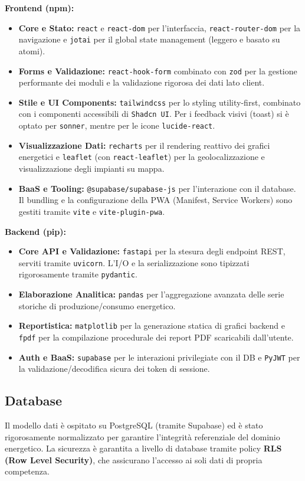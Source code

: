 \textbf{Frontend (npm):}
\begin{itemize}
    \item \textbf{Core e Stato:} \texttt{react} e \texttt{react-dom} per l'interfaccia, \texttt{react-router-dom} per la navigazione e \texttt{jotai} per il global state management (leggero e basato su atomi).
    \item \textbf{Forms e Validazione:} \texttt{react-hook-form} combinato con \texttt{zod} per la gestione performante dei moduli e la validazione rigorosa dei dati lato client.
    \item \textbf{Stile e UI Components:} \texttt{tailwindcss} per lo styling utility-first, combinato con i componenti accessibili di \texttt{Shadcn UI}. Per i feedback visivi (toast) si è optato per \texttt{sonner}, mentre per le icone \texttt{lucide-react}.
    \item \textbf{Visualizzazione Dati:} \texttt{recharts} per il rendering reattivo dei grafici energetici e \texttt{leaflet} (con \texttt{react-leaflet}) per la geolocalizzazione e visualizzazione degli impianti su mappa.
    \item \textbf{BaaS e Tooling:} \texttt{@supabase/supabase-js} per l'interazione con il database. Il bundling e la configurazione della PWA (Manifest, Service Workers) sono gestiti tramite \texttt{vite} e \texttt{vite-plugin-pwa}.
\end{itemize}

\textbf{Backend (pip):}
\begin{itemize}
    \item \textbf{Core API e Validazione:} \texttt{fastapi} per la stesura degli endpoint REST, serviti tramite \texttt{uvicorn}. L'I/O e la serializzazione sono tipizzati rigorosamente tramite \texttt{pydantic}.
    \item \textbf{Elaborazione Analitica:} \texttt{pandas} per l'aggregazione avanzata delle serie storiche di produzione/consumo energetico.
    \item \textbf{Reportistica:} \texttt{matplotlib} per la generazione statica di grafici backend e \texttt{fpdf} per la compilazione procedurale dei report PDF scaricabili dall'utente.
    \item \textbf{Auth e BaaS:} \texttt{supabase} per le interazioni privilegiate con il DB e \texttt{PyJWT} per la validazione/decodifica sicura dei token di sessione.
\end{itemize}

\subsection{Database}
Il modello dati è ospitato su PostgreSQL (tramite Supabase) ed è stato rigorosamente normalizzato per garantire l'integrità referenziale del dominio energetico. La sicurezza è garantita a livello di database tramite policy \textbf{RLS (Row Level Security)}, che assicurano l'accesso ai soli dati di propria competenza.

